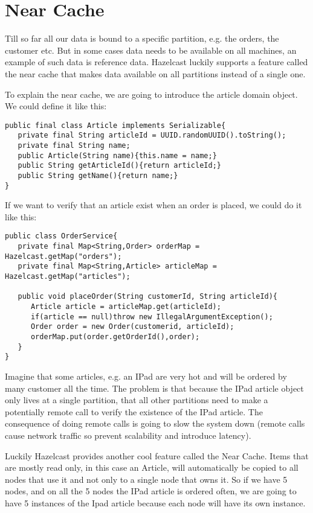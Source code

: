 \section{Near Cache}

Till so far all our data is bound to a specific partition, e.g. the orders, the customer etc. But in some cases  data needs to be available on all machines, an example of such data is reference data. Hazelcast luckily supports  a feature called the near cache that makes data available on all partitions instead of a single one.

To explain the near cache, we are going to introduce the article domain object. We could define it like this:

\begin{verbatim}
public final class Article implements Serializable{
   private final String articleId = UUID.randomUUID().toString();
   private final String name;
   public Article(String name){this.name = name;}
   public String getArticleId(){return articleId;}
   public String getName(){return name;}
}
\end{verbatim}

If we want to verify that an article exist when an order is placed, we could do it like this:

\begin{verbatim}
public class OrderService{
   private final Map<String,Order> orderMap = Hazelcast.getMap("orders");
   private final Map<String,Article> articleMap = Hazelcast.getMap("articles");

   public void placeOrder(String customerId, String articleId){
      Article article = articleMap.get(articleId);
      if(article == null)throw new IllegalArgumentException();
      Order order = new Order(customerid, articleId);
      orderMap.put(order.getOrderId(),order);
   }
}
\end{verbatim}

Imagine that some articles, e.g. an IPad are very hot and will be ordered by many customer all the time. The problem is that because the IPad article object only lives at a single partition, that all other partitions need to make a potentially remote call to verify the existence of the IPad article. The consequence of doing remote calls is going to slow the system down (remote calls cause network traffic so prevent scalability and introduce latency).

Luckily Hazelcast provides another cool feature called the Near Cache. Items that are mostly read only, in this case an Article, will automatically be copied to all nodes that use it and not only to a single node that owns it. So if we have 5 nodes, and on all the 5 nodes the IPad article is ordered often, we are going to have 5 instances of the Ipad article because each node will have its own instance.

